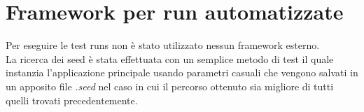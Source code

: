 \chapter*{Framework per run automatizzate}
\label{cha_framework}

Per eseguire le test runs non è stato utilizzato nessun framework esterno. \\
La ricerca dei seed è stata effettuata con un semplice metodo di test il quale instanzia 
l'applicazione principale usando parametri casuali che vengono salvati in un apposito file
\emph{.seed} nel caso in cui il percorso ottenuto sia migliore di tutti quelli trovati 
precedentemente.